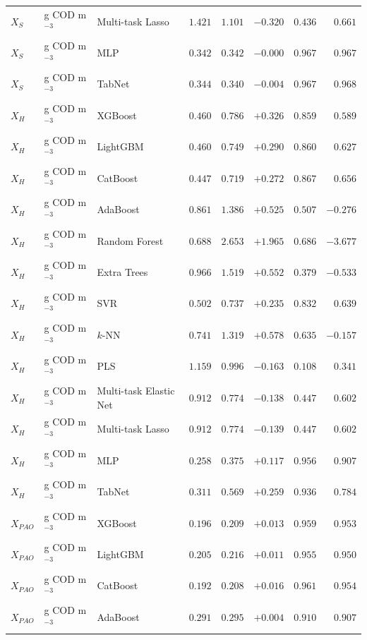 \begin{longtable}{llp{3.1cm}rrrrr}
$X_{S}$ & g COD m$^{-3}$ & Multi-task Lasso & $1.421$ & $1.101$ & $-0.320$ & $0.436$ & $0.661$ \\
$X_{S}$ & g COD m$^{-3}$ & MLP & $0.342$ & $0.342$ & $-0.000$ & $0.967$ & $0.967$ \\
$X_{S}$ & g COD m$^{-3}$ & TabNet & $0.344$ & $0.340$ & $-0.004$ & $0.967$ & $0.968$ \\
$X_{H}$ & g COD m$^{-3}$ & XGBoost & $0.460$ & $0.786$ & $+0.326$ & $0.859$ & $0.589$ \\
$X_{H}$ & g COD m$^{-3}$ & LightGBM & $0.460$ & $0.749$ & $+0.290$ & $0.860$ & $0.627$ \\
$X_{H}$ & g COD m$^{-3}$ & CatBoost & $0.447$ & $0.719$ & $+0.272$ & $0.867$ & $0.656$ \\
$X_{H}$ & g COD m$^{-3}$ & AdaBoost & $0.861$ & $1.386$ & $+0.525$ & $0.507$ & $-0.276$ \\
$X_{H}$ & g COD m$^{-3}$ & Random Forest & $0.688$ & $2.653$ & $+1.965$ & $0.686$ & $-3.677$ \\
$X_{H}$ & g COD m$^{-3}$ & Extra Trees & $0.966$ & $1.519$ & $+0.552$ & $0.379$ & $-0.533$ \\
$X_{H}$ & g COD m$^{-3}$ & SVR & $0.502$ & $0.737$ & $+0.235$ & $0.832$ & $0.639$ \\
$X_{H}$ & g COD m$^{-3}$ & $k$-NN & $0.741$ & $1.319$ & $+0.578$ & $0.635$ & $-0.157$ \\
$X_{H}$ & g COD m$^{-3}$ & PLS & $1.159$ & $0.996$ & $-0.163$ & $0.108$ & $0.341$ \\
$X_{H}$ & g COD m$^{-3}$ & Multi-task Elastic Net & $0.912$ & $0.774$ & $-0.138$ & $0.447$ & $0.602$ \\
$X_{H}$ & g COD m$^{-3}$ & Multi-task Lasso & $0.912$ & $0.774$ & $-0.139$ & $0.447$ & $0.602$ \\
$X_{H}$ & g COD m$^{-3}$ & MLP & $0.258$ & $0.375$ & $+0.117$ & $0.956$ & $0.907$ \\
$X_{H}$ & g COD m$^{-3}$ & TabNet & $0.311$ & $0.569$ & $+0.259$ & $0.936$ & $0.784$ \\
$X_{PAO}$ & g COD m$^{-3}$ & XGBoost & $0.196$ & $0.209$ & $+0.013$ & $0.959$ & $0.953$ \\
$X_{PAO}$ & g COD m$^{-3}$ & LightGBM & $0.205$ & $0.216$ & $+0.011$ & $0.955$ & $0.950$ \\
$X_{PAO}$ & g COD m$^{-3}$ & CatBoost & $0.192$ & $0.208$ & $+0.016$ & $0.961$ & $0.954$ \\
$X_{PAO}$ & g COD m$^{-3}$ & AdaBoost & $0.291$ & $0.295$ & $+0.004$ & $0.910$ & $0.907$ \\

\end{longtable}
